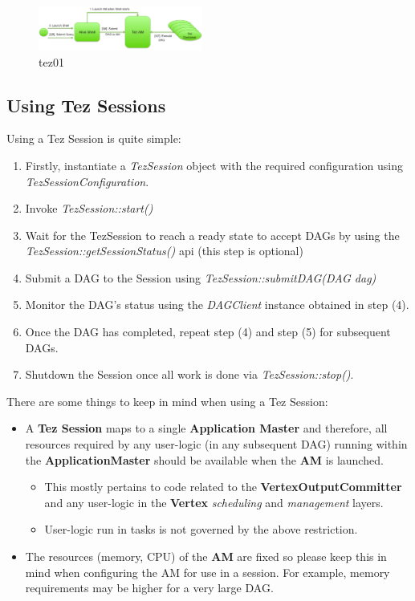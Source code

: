 \documentclass[twocolumn]{article}
\begin{document}
\begin{figure}[htb]
        \centering
        \includegraphics[width=0.48\textwidth]{sessions-tez1}
        \caption{tez01}
        \label{fig17}
\end{figure}

\subsection{Using Tez Sessions}

Using a Tez Session is quite simple:

\begin{enumerate}

\item
  Firstly, instantiate a \emph{TezSession} object with the required
  configuration using \emph{TezSessionConfiguration}.
\item
  Invoke \emph{TezSession::start()}
\item
  Wait for the TezSession to reach a ready state to accept DAGs by using
  the \emph{TezSession::getSessionStatus()} api (this step is
  optional)
\item
  Submit a DAG to the Session using
  \emph{TezSession::submitDAG(DAG dag)}
\item
  Monitor the DAG's status using the \emph{DAGClient} instance
  obtained in step (4).
\item
  Once the DAG has completed, repeat step (4) and step (5) for
  subsequent DAGs.
\item
  Shutdown the Session once all work is done via
  \emph{TezSession::stop()}.
\end{enumerate}

There are some things to keep in mind when using a Tez Session:

\begin{itemize}

\item
  A \textbf{Tez Session} maps to a single \textbf{Application Master}
  and therefore, all resources required by any user-logic (in any
  subsequent DAG) running within the \textbf{ApplicationMaster} should
  be available when the \textbf{AM} is launched.

  \begin{itemize}
  
  \item
    This mostly pertains to code related to the
    \textbf{VertexOutputCommitter} and any user-logic in the
    \textbf{Vertex} \emph{scheduling} and \emph{management} layers.
  \item
    User-logic run in tasks is not governed by the above restriction.
  \end{itemize}
\item
  The resources (memory, CPU) of the \textbf{AM} are fixed so please
  keep this in mind when configuring the AM for use in a session. For
  example, memory requirements may be higher for a very large DAG.
\end{itemize}
\end{document}
